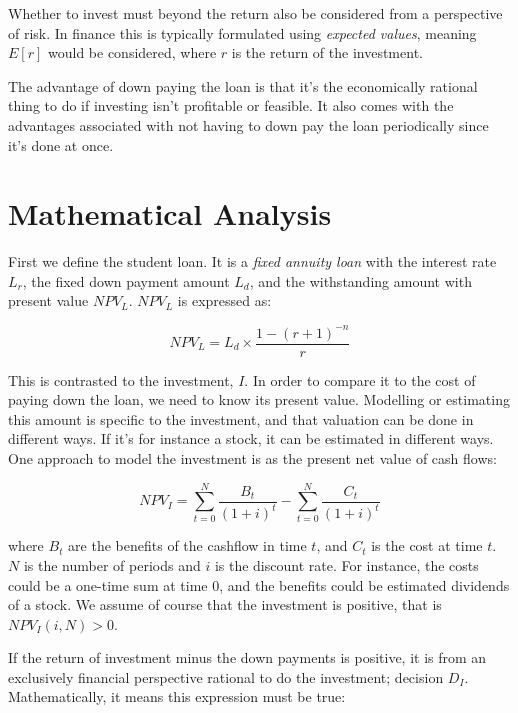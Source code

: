 \documentclass[a4paper]{article}
\begin{document}
Whether to invest must beyond the return also be considered from a perspective
of risk. In finance this is typically formulated using \emph{expected values},
meaning $E[r]$ would be considered, where $r$ is the return of the investment.

The advantage of down paying the loan is that it's the economically rational thing
to do if investing isn't profitable or feasible. It also comes with the
advantages associated with not having to down pay the loan periodically since
it's done at once.

\section{Mathematical Analysis}

First we define the student loan. It is a \emph{fixed annuity loan} with the
interest rate $L_r$, the fixed down payment amount $L_d$, and the withstanding
amount with present value $NPV_L$. $NPV_L$ is expressed as:


\begin{equation}
\label{eq:NPV_L}
NPV_L=L_d \times \frac{1 - (r + 1)^{-n}}{r}
\end{equation}

This is contrasted to the investment, $I$. In order to compare it to the cost of
paying down the loan, we need to know its present value. Modelling or estimating
this amount is specific to the investment, and that valuation can be done in
different ways. If it's for instance a stock, it can be estimated in different
ways. One approach to model the investment is as the present net value of cash
flows:


\begin{equation}
\label{eq:NPV_I}
NPV_I = {\sum_{t=0}^{N} \frac{B_t}{(1 + i)^t} -
         \sum_{t=0}^{N} \frac{C_t}{(1 + i)^t}}
\end{equation}

where $B_t$ are the benefits of the cashflow in time $t$, and $C_t$ is the cost
at time $t$. $N$ is the number of periods and $i$ is the discount rate. For
instance, the costs could be a one-time sum at time $0$, and the benefits could
be estimated dividends of a stock. We assume of course that the investment is
positive, that is $NPV_I(i, N) > 0$.

If the return of investment minus the down payments is positive, it is from an
exclusively financial perspective rational to do the investment; decision $D_I$.
Mathematically, it means this expression must be true:
\end{document}
